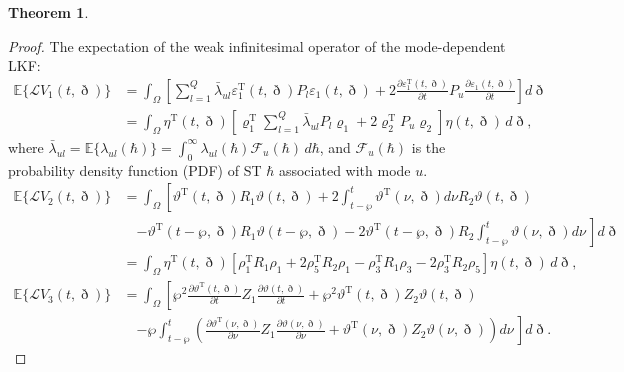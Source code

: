 \documentclass[preprint,review,fleqn,sort&compress,3p]{elsarticle}
\theoremstyle{definition}%
\newtheorem{thm}{Theorem}[section]
\begin{document}
\begin{thm}
\begin{proof}
		The expectation of the weak infinitesimal operator of the mode-dependent LKF:
		\begin{align}\label{equ24}
			\mathbb{E} \{ \mathcal{L} V_1(t, \eth) \} &= \int_\Omega \left[ \sum_{l=1}^{Q} \bar{\lambda}_{ul} \varepsilon_1^\text{T}(t, \eth) P_l \varepsilon_1(t, \eth) + 2 \frac{\partial \varepsilon_1^\text{T}(t, \eth)}{\partial t} P_u \frac{\partial \varepsilon_1(t, \eth)}{\partial t} \right] d\eth\nonumber\\
			&= \int_\Omega \eta^\text{T}(t, \eth) \left[ \varrho_1^\text{T} \sum_{l=1}^Q \bar{\lambda}_{ul} P_l \varrho_1 + 2 \varrho_2^\text{T} P_u \varrho_2 \right] \eta(t, \eth) \, d\eth,
		\end{align}
		where $\bar{\lambda}_{ul} = \mathbb{E} \{ \lambda_{ul}(\hbar) \} = \int_0^\infty \lambda_{ul}(\hbar) \mathcal{F}_u(\hbar) \, d\hbar$, and $\mathcal{F}_u(\hbar)$ is the probability density function (PDF) of ST $\hbar$ associated with mode $u$.
		\begin{align}\label{equ25}
			\mathbb{E} \{ \mathcal{L} V_2(t, \eth) \} &= \int_\Omega \left[ \vartheta^\text{T}(t, \eth) R_1 \vartheta(t, \eth) + 2\int_{t-\wp}^t \vartheta^\text{T}(\nu, \eth) d\nu R_2 \vartheta(t, \eth) \right.\nonumber\\
			&\quad \left.- \vartheta^\text{T}(t - \wp, \eth) R_1 \vartheta(t - \wp, \eth) - 2\vartheta^\text{T}(t - \wp, \eth) R_2 \int_{t-\wp}^t \vartheta(\nu, \eth) d\nu \,\right] d\eth \nonumber\\
			&= \int_\Omega \eta^\text{T}(t, \eth) \left[ \rho_1^\text{T} R_1 \rho_1 + 2\rho_5^\text{T} R_2 \rho_1 - \rho_3^\text{T} R_1 \rho_3 - 2\rho_3^\text{T} R_2 \rho_5 \right] \eta(t, \eth) \, d\eth,
		\end{align}
		\begin{align}\label{dv3}
			\mathbb{E} \{ \mathcal{L} V_3(t, \eth) \} &= \int_\Omega \left[ \wp^2 \frac{\partial \vartheta^\text{T}(t, \eth)}{\partial t} Z_1 \frac{\partial \vartheta(t, \eth)}{\partial t} + \wp^2 \vartheta^\text{T}(t, \eth) Z_2 \vartheta(t, \eth)\right.\nonumber\\
			&\quad \left.- \wp \int_{t-\wp}^t \left( \frac{\partial \vartheta^\text{T}(\nu, \eth)}{\partial \nu} Z_1 \frac{\partial \vartheta(\nu, \eth)}{\partial \nu} + \vartheta^\text{T}(\nu, \eth) Z_2 \vartheta(\nu, \eth) \right) d\nu \,\right] d\eth. 
		\end{align}
		

\end{proof}
\end{thm}
\end{document}
